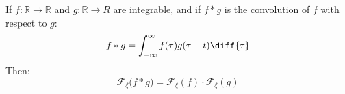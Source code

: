 \documentclass[crop=false,class=book,oneside]{standalone}
\begin{document}
            \begin{theorem}
                If $f:\mathbb{R}\rightarrow\mathbb{R}$ and
                $g:\mathbb{R}\rightarrow{R}$ are integrable,
                and if $f*g$ is the convolution of $f$ with
                respect to $g$:
                \begin{equation}
                    f*g=\int_{-\infty}^{\infty}
                        f(\tau)g(\tau-t)\diff{\tau}
                \end{equation}
                Then:
                \begin{equation}
                    \mathcal{F}_{\xi}\big(f*g\big)
                    =\mathcal{F}_{\xi}(f)\cdot\mathcal{F}_{\xi}(g)
                \end{equation}
            \end{theorem}
\end{document}
